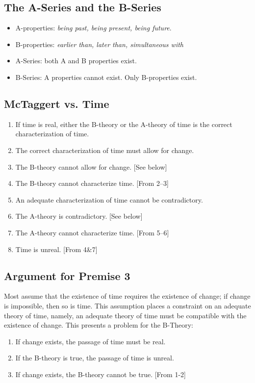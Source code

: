\documentclass[oneside]{article}
\begin{document}
\subsection*{The A-Series and the B-Series}

\begin{itemize} 
\item A-properties: \emph{being past, being present, being future}.
\item B-properties: \emph{earlier than, later than, simultaneous with}
\item A-Series: both A and B properties exist. 
\item B-Series: A properties cannot exist. Only B-properties exist. 
\end{itemize}


\subsection*{McTaggert vs. Time}

\begin{enumerate}
\item If time is real, either the B-theory or the A-theory of time is the correct characterization of time. 
\item The correct characterization of time must allow for change. 
\item The B-theory cannot allow for change. [See below]
\item The B-theory cannot characterize time. [From 2--3]
\item An adequate characterization of time cannot be contradictory. 
\item The A-theory is contradictory. [See below]
\item The A-theory cannot characterize time. [From 5--6] 
\item Time is unreal. [From 4\&7]
\end{enumerate}



\subsection*{Argument for Premise 3}
Most assume that the existence of time requires the existence of change; if change is impossible, then so is time. This assumption places a constraint on an adequate theory of time, namely, an adequate theory of time must be compatible with the existence of change. This presents a problem for the B-Theory: 
\begin{enumerate}
\item If change exists, the passage of time must be real.
\item If the B-theory is true, the passage of time is unreal.
\item If change exists, the B-theory cannot be true. [From 1-2]
\end{enumerate} 
\end{document}
